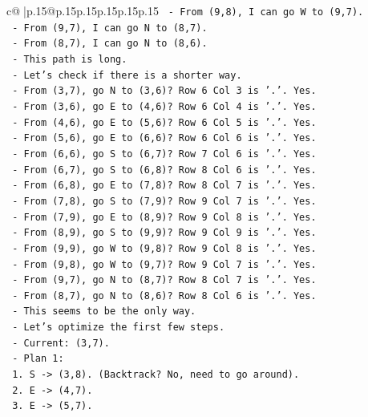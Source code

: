\documentclass{article}
\begin{document}
{\begin{supertabular}{c@{$\;$}|p{.15\linewidth}@{}p{.15\linewidth}p{.15\linewidth}p{.15\linewidth}p{.15\linewidth}p{.15\linewidth}}
{{{\texttt{       {-} From (9,8), I can go W to (9,7).} \\
\texttt{       {-} From (9,7), I can go N to (8,7).} \\
\texttt{       {-} From (8,7), I can go N to (8,6).} \\
\texttt{     {-} This path is long.} \\
\texttt{     {-} Let's check if there is a shorter way.} \\
\texttt{     {-} From (3,7), go N to (3,6)? Row 6 Col 3 is '.'. Yes.} \\
\texttt{     {-} From (3,6), go E to (4,6)? Row 6 Col 4 is '.'. Yes.} \\
\texttt{     {-} From (4,6), go E to (5,6)? Row 6 Col 5 is '.'. Yes.} \\
\texttt{     {-} From (5,6), go E to (6,6)? Row 6 Col 6 is '.'. Yes.} \\
\texttt{     {-} From (6,6), go S to (6,7)? Row 7 Col 6 is '.'. Yes.} \\
\texttt{     {-} From (6,7), go S to (6,8)? Row 8 Col 6 is '.'. Yes.} \\
\texttt{     {-} From (6,8), go E to (7,8)? Row 8 Col 7 is '.'. Yes.} \\
\texttt{     {-} From (7,8), go S to (7,9)? Row 9 Col 7 is '.'. Yes.} \\
\texttt{     {-} From (7,9), go E to (8,9)? Row 9 Col 8 is '.'. Yes.} \\
\texttt{     {-} From (8,9), go S to (9,9)? Row 9 Col 9 is '.'. Yes.} \\
\texttt{     {-} From (9,9), go W to (9,8)? Row 9 Col 8 is '.'. Yes.} \\
\texttt{     {-} From (9,8), go W to (9,7)? Row 9 Col 7 is '.'. Yes.} \\
\texttt{     {-} From (9,7), go N to (8,7)? Row 8 Col 7 is '.'. Yes.} \\
\texttt{     {-} From (8,7), go N to (8,6)? Row 8 Col 6 is '.'. Yes.} \\
\texttt{     {-} This seems to be the only way.} \\
\texttt{     {-} Let's optimize the first few steps.} \\
\texttt{     {-} Current: (3,7).} \\
\texttt{     {-} Plan 1:} \\
\texttt{       1. S {-}> (3,8). (Backtrack? No, need to go around).} \\
\texttt{       2. E {-}> (4,7).} \\
\texttt{       3. E {-}> (5,7).} \\
}}}
\end{supertabular}}
\end{document}
